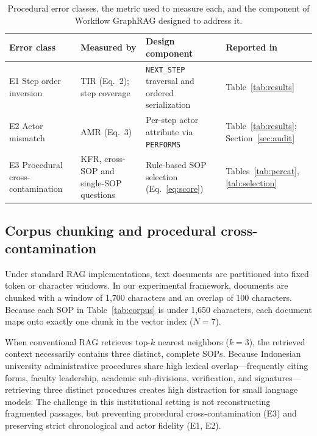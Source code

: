\documentclass[preprint,10pt]{elsarticle}
\begin{document}
\begin{table}[!htbp]
\centering
\caption{Procedural error classes, the metric used to measure each, and the component of Workflow GraphRAG designed to address it.}
\label{tab:errormap}
\small
\setlength{\tabcolsep}{4pt}
\begin{tabularx}{\textwidth}{>{\raggedright\arraybackslash}p{2.2cm} >{\raggedright\arraybackslash}X >{\raggedright\arraybackslash}p{3.0cm} >{\raggedright\arraybackslash}p{2.0cm}}
\toprule
Error class & Measured by & Design component & Reported in \\
\midrule
E1 Step order inversion & TIR (Eq.~2); step coverage & \texttt{NEXT\_STEP} traversal and ordered serialization & Table~\ref{tab:results} \\
E2 Actor mismatch & AMR (Eq.~3) & Per-step actor attribute via \texttt{PERFORMS} & Table~\ref{tab:results}; Section~\ref{sec:audit} \\
E3 Procedural cross-contamination & KFR, cross-SOP and single-SOP questions & Rule-based SOP selection (Eq.~\eqref{eq:score}) & Tables~\ref{tab:percat}, \ref{tab:selection} \\
\bottomrule
\end{tabularx}
\end{table}

\subsection{Corpus chunking and procedural cross-contamination}
Under standard RAG implementations, text documents are partitioned into fixed token or character windows. In our experimental framework, documents are chunked with a window of 1,700 characters and an overlap of 100 characters. Because each SOP in Table~\ref{tab:corpus} is under 1,650 characters, each document maps onto exactly one chunk in the vector index ($N = 7$).

When conventional RAG retrieves top-$k$ nearest neighbors ($k=3$), the retrieved context necessarily contains three distinct, complete SOPs. Because Indonesian university administrative procedures share high lexical overlap---frequently citing forms, faculty leadership, academic sub-divisions, verification, and signatures---retrieving three distinct procedures creates high distraction for small language models. The challenge in this institutional setting is not reconstructing fragmented passages, but preventing procedural cross-contamination (E3) and preserving strict chronological and actor fidelity (E1, E2).
\end{document}
